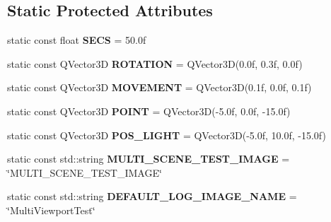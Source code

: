 \subsection*{Static Protected Attributes}
\begin{DoxyCompactItemize}
\item 
\mbox{\label{class_unit_test_1_1_c_multi_viewport_scene_test_a638507d7204d3580034716870f16fb11}} 
static const float {\bfseries S\+E\+CS} = 50.\+0f
\item 
\mbox{\label{class_unit_test_1_1_c_multi_viewport_scene_test_a1cdac857b6abeded1c3e6e93ee160a96}} 
static const Q\+Vector3D {\bfseries R\+O\+T\+A\+T\+I\+ON} = Q\+Vector3D(0.\+0f, 0.\+3f, 0.\+0f)
\item 
\mbox{\label{class_unit_test_1_1_c_multi_viewport_scene_test_a3119fec4de713ca018494844bca0cbc6}} 
static const Q\+Vector3D {\bfseries M\+O\+V\+E\+M\+E\+NT} = Q\+Vector3D(0.\+1f, 0.\+0f, 0.\+1f)
\item 
\mbox{\label{class_unit_test_1_1_c_multi_viewport_scene_test_a38aec04141cb839386e8f936834ce33c}} 
static const Q\+Vector3D {\bfseries P\+O\+I\+NT} = Q\+Vector3D(-\/5.\+0f, 0.\+0f, -\/15.\+0f)
\item 
\mbox{\label{class_unit_test_1_1_c_multi_viewport_scene_test_a7a161d9c8db8c2f86634a5b32f998a8b}} 
static const Q\+Vector3D {\bfseries P\+O\+S\+\_\+\+L\+I\+G\+HT} = Q\+Vector3D(-\/5.\+0f, 10.\+0f, -\/15.\+0f)
\item 
\mbox{\label{class_unit_test_1_1_c_multi_viewport_scene_test_a3489f90d82e3365560ffb07f64e1a5b2}} 
static const std\+::string {\bfseries M\+U\+L\+T\+I\+\_\+\+S\+C\+E\+N\+E\+\_\+\+T\+E\+S\+T\+\_\+\+I\+M\+A\+GE} = \char`\"{}M\+U\+L\+T\+I\+\_\+\+S\+C\+E\+N\+E\+\_\+\+T\+E\+S\+T\+\_\+\+I\+M\+A\+GE\char`\"{}
\item 
\mbox{\label{class_unit_test_1_1_c_multi_viewport_scene_test_aaae0c1ffb25e48199048aeb52600f907}} 
static const std\+::string {\bfseries D\+E\+F\+A\+U\+L\+T\+\_\+\+L\+O\+G\+\_\+\+I\+M\+A\+G\+E\+\_\+\+N\+A\+ME} = \char`\"{}Multi\+Viewport\+Test\char`\"{}
\end{DoxyCompactItemize}


